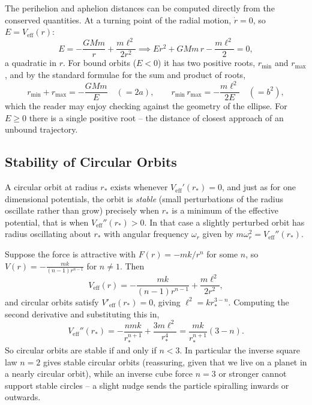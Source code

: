 \begin{example}
	The perihelion and aphelion distances can be computed directly from the conserved quantities. At a turning point of the radial motion, $\dot{r} = 0$, so $E = V_{\text{eff}}(r)$:
	$$
	E = -\frac{GMm}{r} + \frac{m\ell^2}{2r^2} \implies E r^2 + GMm\, r - \frac{m\ell^2}{2} = 0,
	$$
	a quadratic in $r$. For bound orbits ($E < 0$) it has two positive roots, $r_{\min}$ and $r_{\max}$, and by the standard formulae for the sum and product of roots,
	$$
	r_{\min} + r_{\max} = -\frac{GMm}{E} \quad (= 2a), \qquad r_{\min}\, r_{\max} = -\frac{m \ell^2}{2E} \quad (= b^2),
	$$
	which the reader may enjoy checking against the geometry of the ellipse. For $E \geq 0$ there is a single positive root -- the distance of closest approach of an unbound trajectory.
\end{example}

\subsection{Stability of Circular Orbits}

A circular orbit at radius $r_*$ exists whenever $V_{\text{eff}}'(r_*) = 0$, and just as for one dimensional potentials, the orbit is \emph{stable} (small perturbations of the radius oscillate rather than grow) precisely when $r_*$ is a minimum of the effective potential, that is when $V_{\text{eff}}''(r_*) > 0$. In that case a slightly perturbed orbit has radius oscillating about $r_*$ with angular frequency $\omega_r$ given by $m\omega_r^2 = V_{\text{eff}}''(r_*)$.

\begin{example}
	Suppose the force is attractive with $F(r) = -mk/r^n$ for some $n$, so $V(r) = -\frac{mk}{(n-1)r^{n - 1}}$ for $n \neq 1$. Then
	$$
	V_{\text{eff}}(r) = -\frac{mk}{(n - 1) r^{n-1}} + \frac{m \ell^2}{2 r^2},
	$$
	and circular orbits satisfy $V'_{\text{eff}}(r_*) = 0$, giving $\ell^2 = k r_*^{3 - n}$. Computing the second derivative and substituting this in,
	$$
	V_{\text{eff}}''(r_*) = -\frac{nmk}{r_*^{n +1}} + \frac{3m\ell^2}{r_*^4} = \frac{mk}{r_*^{n + 1}}\left(3 - n\right).
	$$
	So circular orbits are stable if and only if $n < 3$. In particular the inverse square law $n = 2$ gives stable circular orbits (reassuring, given that we live on a planet in a nearly circular orbit), while an inverse cube force $n = 3$ or stronger cannot support stable circles -- a slight nudge sends the particle spiralling inwards or outwards.
\end{example}

